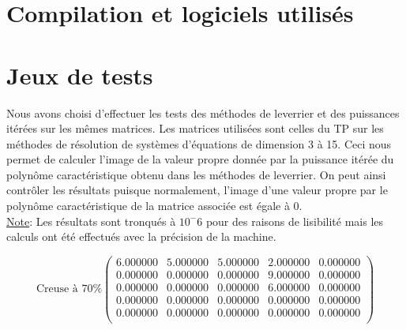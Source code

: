 \documentclass{report}
\begin{document}
    \section{Compilation et logiciels utilisés}
    \section{Jeux de tests}
      Nous avons choisi d'effectuer les tests des méthodes de leverrier et des puissances itérées sur les mêmes matrices. Les matrices utilisées sont celles du TP sur les méthodes de résolution de systèmes d'équations de dimension 3 à 15. Ceci nous permet de calculer l'image de la valeur propre donnée par la puissance itérée du polynôme caractéristique obtenu dans les méthodes de leverrier. On peut ainsi contrôler les résultats puisque normalement, l'image d'une valeur propre par le polynôme caractéristique de la matrice associée est égale à 0. \\
      
      \underline{Note}: Les résultats sont tronqués à $10^-6$ pour des raisons de lisibilité mais les calculs ont été effectués avec la précision de la machine.
      
      \begin{equation}
	\textrm{Creuse à 70\%}
	\begin{pmatrix}
	6.000000 & 5.000000 & 5.000000 & 2.000000 & 0.000000 \\ 
	0.000000 & 0.000000 & 0.000000 & 9.000000 & 0.000000 \\ 
	0.000000 & 0.000000 & 0.000000 & 6.000000 & 0.000000 \\ 
	0.000000 & 0.000000 & 0.000000 & 0.000000 & 0.000000 \\ 
	0.000000 & 0.000000 & 0.000000 & 0.000000 & 0.000000 \\ 
	\end{pmatrix}
	\label{syst1}
	\end{equation}
	
\end{document}
